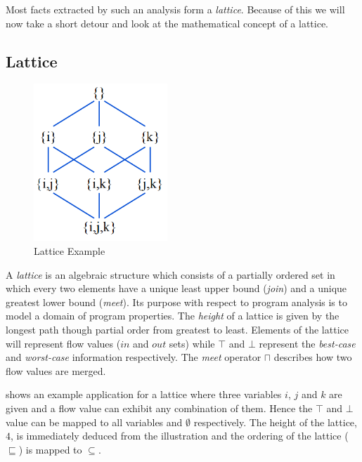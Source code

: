 \documentclass[article]{uibk}
\begin{document}
Most facts extracted by such an analysis form a \textit{lattice}. Because of
this we will now take a short detour and look at the mathematical concept of a
lattice.

\subsection{Lattice}


\begin{figure}
    \vspace{-6em}
    \centering
    \includegraphics[height=16em]{gfx/lattice.png}
    \caption{Lattice Example}
    \label{fig:lattice}
\end{figure}

A \textit{lattice} is an algebraic structure which consists of a partially
ordered set in which every two elements have a unique least upper bound
(\textit{join}) and a unique greatest lower bound (\textit{meet}). Its purpose
with respect to program analysis is to model a domain of program properties.
The \textit{height} of a lattice is given by the longest path though partial
order from greatest to least. Elements of the lattice will represent flow
values ($in$ and $out$ sets) while $\top$ and $\bot$ represent the
\textit{best-case} and \textit{worst-case} information respectively. The
\textit{meet} operator $\sqcap$ describes how two flow values are
merged.~\cite{wiki:lattice,slides:lattice,slides:lattice2}

 shows an example application for a lattice where three
variables $i$, $j$ and $k$ are given and a flow value can exhibit any
combination of them. Hence the $\top$ and $\bot$ value can be mapped to all
variables and $\emptyset$ respectively. The height of the lattice, $4$, is
immediately deduced from the illustration and the ordering of the lattice
($\sqsubseteq$) is mapped to $\subseteq$.
\end{document}

